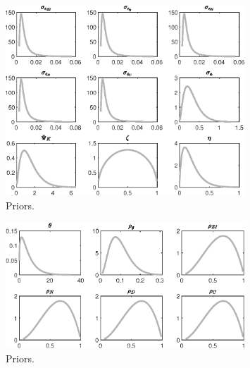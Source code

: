  
\begin{figure}[H]
\centering
\includegraphics[width=0.80\textwidth]{BRS_imp_mobility_alt/graphs/BRS_imp_mobility_alt_Priors1}
\caption{Priors.}\label{Fig:Priors:1}
\end{figure}
\begin{figure}[H]
\centering
\includegraphics[width=0.80\textwidth]{BRS_imp_mobility_alt/graphs/BRS_imp_mobility_alt_Priors2}
\caption{Priors.}\label{Fig:Priors:2}
\end{figure}
 

